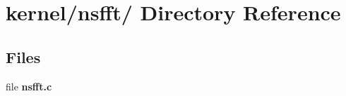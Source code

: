 \hypertarget{dir_000028}{
\section{kernel/nsfft/ Directory Reference}
\label{dir_000028}
}
\subsection*{Files}
\begin{CompactItemize}
\item 
file {\bf nsfft.c}
\end{CompactItemize}
